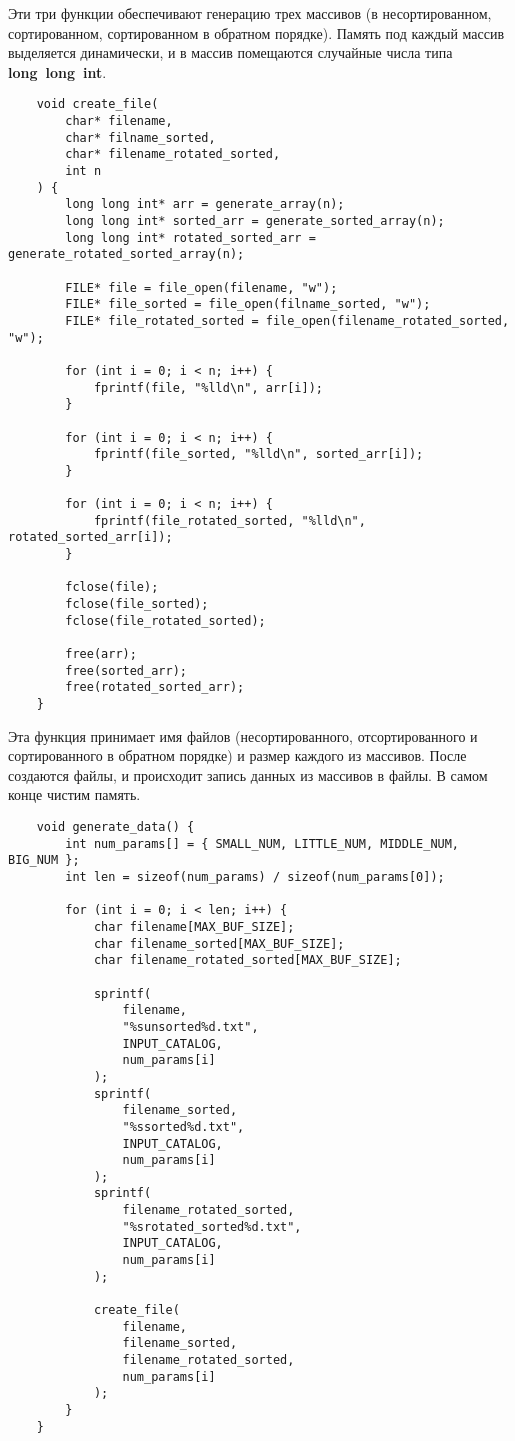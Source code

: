 \documentclass[a4paper,12pt,titlepage,finall]{article}
\begin{document}
Эти три функции обеспечивают генерацию трех массивов (в несортированном, сортированном, сортированном в обратном порядке).
Память под каждый массив выделяется динамически, и в массив помещаются случайные числа типа \textbf{long~long~int}.

\begin{verbatim}
    void create_file(
        char* filename,
        char* filname_sorted,
        char* filename_rotated_sorted,
        int n
    ) {
        long long int* arr = generate_array(n);
        long long int* sorted_arr = generate_sorted_array(n);
        long long int* rotated_sorted_arr = generate_rotated_sorted_array(n);

        FILE* file = file_open(filename, "w");
        FILE* file_sorted = file_open(filname_sorted, "w");
        FILE* file_rotated_sorted = file_open(filename_rotated_sorted, "w");

        for (int i = 0; i < n; i++) {
            fprintf(file, "%lld\n", arr[i]);
        }

        for (int i = 0; i < n; i++) {
            fprintf(file_sorted, "%lld\n", sorted_arr[i]);
        }

        for (int i = 0; i < n; i++) {
            fprintf(file_rotated_sorted, "%lld\n", rotated_sorted_arr[i]);
        }

        fclose(file);
        fclose(file_sorted);
        fclose(file_rotated_sorted);

        free(arr);
        free(sorted_arr);
        free(rotated_sorted_arr);
    }
\end{verbatim}

Эта функция принимает имя файлов (несортированного, отсортированного и сортированного в обратном порядке) и размер каждого из массивов.
После создаются файлы, и происходит запись данных из массивов в файлы. В самом конце чистим память.

\begin{verbatim}
    void generate_data() {
        int num_params[] = { SMALL_NUM, LITTLE_NUM, MIDDLE_NUM, BIG_NUM };
        int len = sizeof(num_params) / sizeof(num_params[0]);

        for (int i = 0; i < len; i++) {
            char filename[MAX_BUF_SIZE];
            char filename_sorted[MAX_BUF_SIZE];
            char filename_rotated_sorted[MAX_BUF_SIZE];

            sprintf(
                filename,
                "%sunsorted%d.txt",
                INPUT_CATALOG,
                num_params[i]
            );
            sprintf(
                filename_sorted,
                "%ssorted%d.txt",
                INPUT_CATALOG,
                num_params[i]
            );
            sprintf(
                filename_rotated_sorted,
                "%srotated_sorted%d.txt",
                INPUT_CATALOG,
                num_params[i]
            );

            create_file(
                filename,
                filename_sorted,
                filename_rotated_sorted,
                num_params[i]
            );
        }
    }
\end{verbatim}
\end{document}
